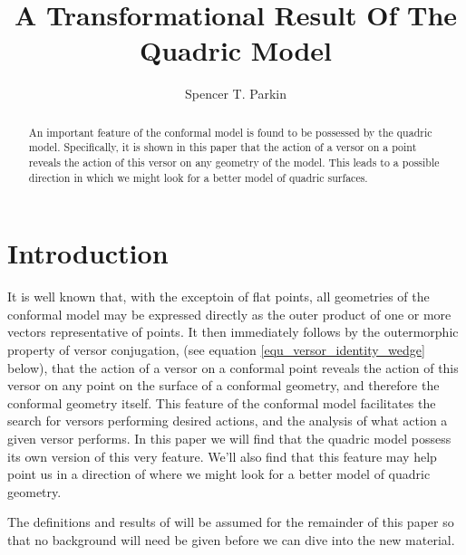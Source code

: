 \documentclass{birkjour}
\theoremstyle{definition}
\theoremstyle{remark}
\numberwithin{equation}{section}
\begin{document}
\title{A Transformational Result Of The Quadric Model}

\author{Spencer T. Parkin}
\address{%
2113 S. Claremont Dr.\\
Bountiful, Utah  84010\\
USA}





\begin{abstract}
An important feature of the conformal model is found
to be possessed by the quadric model.  Specifically, it is
shown in this paper that the action of a versor on a point
reveals the action of this versor on any geometry of the model.
This leads to a possible direction in which we might look for a better model of quadric surfaces.
\end{abstract}

\maketitle

\section{Introduction}

It is well known that, with the exceptoin of flat points, all geometries of
the conformal model may be expressed directly as the outer product
of one or more vectors representative of points.  It then immediately
follows by the outermorphic property of versor conjugation, (see
equation \eqref{equ_versor_identity_wedge} below), that the
action of a versor on a conformal point reveals the action of this versor
on any point on the surface of a conformal geometry, and therefore
the conformal geometry itself.  This feature of the conformal model
facilitates the search for versors performing desired actions, and the
analysis of what action a given versor performs.  In this paper we
will find that the quadric model possess its own version of this very feature.
We'll also find that this feature may help point us in a direction of where
we might look for a better model of quadric geometry.

The definitions and results of \cite{Parkin12} will be assumed for
the remainder of this paper so that no background will need be
given before we can dive into the new material.
\end{document}
